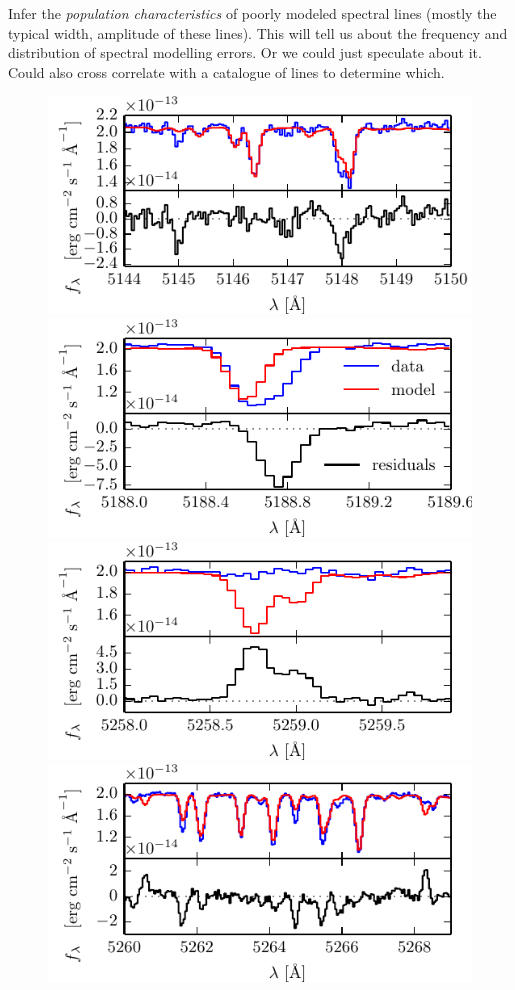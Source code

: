 \documentclass[iop,floatfix]{emulateapj}
\begin{document}
Infer the \emph{population characteristics} of poorly modeled spectral lines (mostly the typical width, amplitude of these lines).  This will tell us about the frequency and distribution of spectral modelling errors. Or we could just speculate about it. Could also cross correlate with a catalogue of lines to determine which.

\begin{figure}[!htb]
\begin{center}
  \includegraphics{figs/badlines0.pdf}
  \includegraphics{figs/badlines1.pdf}
  \includegraphics{figs/badlines2.pdf}
  \includegraphics{figs/badlines3.pdf}

\end{center}
\end{figure}
\end{document}
